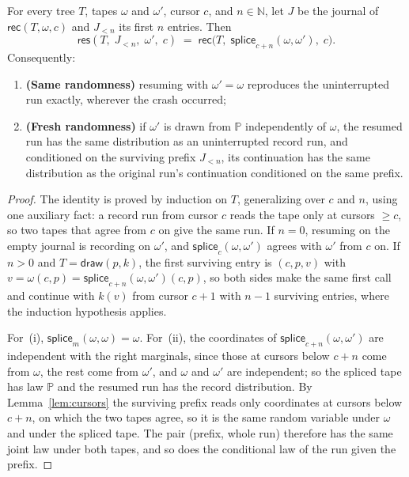\begin{corollary}
\label{cor:resume}
For every tree $T$, tapes $\omega$ and $\omega'$, cursor $c$, and $n \in \mathbb{N}$, let $J$
be the journal of $\mathsf{rec}(T, \omega, c)$ and $J_{<n}$ its first $n$ entries.
Then
\[
  \mathsf{res}(T,\; J_{<n},\; \omega',\; c) \;=\; \mathsf{rec}\bigl(T,\; \mathsf{splice}_{c+n}(\omega, \omega'),\; c\bigr).
\]
Consequently:
\begin{enumerate}[label=(\roman*), noitemsep]
  \item \textbf{(Same randomness)} resuming with $\omega' = \omega$ reproduces the uninterrupted
    run exactly, wherever the crash occurred;
  \item \textbf{(Fresh randomness)} if $\omega'$ is drawn from $\mathbb{P}$ independently of
    $\omega$, the resumed run has the same distribution as an uninterrupted record run, and
    conditioned on the surviving prefix $J_{<n}$, its continuation has the same distribution
    as the original run's continuation conditioned on the same prefix.
\end{enumerate}
\end{corollary}

\begin{proof}
The identity is proved by induction on $T$, generalizing over $c$ and $n$, using one auxiliary
fact: a record run from cursor $c$ reads the tape only at cursors $\geq c$, so two tapes that
agree from $c$ on give the same run.
If $n = 0$, resuming on the empty journal is recording on $\omega'$, and
$\mathsf{splice}_c(\omega, \omega')$ agrees with $\omega'$ from $c$ on.
If $n > 0$ and $T = \mathsf{draw}(p, k)$, the first surviving entry is $(c, p, v)$ with
$v = \omega(c, p) = \mathsf{splice}_{c+n}(\omega,\omega')(c, p)$, so both sides make the same
first call and continue with $k(v)$ from cursor $c+1$ with $n-1$ surviving entries, where the
induction hypothesis applies.

For~(i), $\mathsf{splice}_m(\omega, \omega) = \omega$.
For~(ii), the coordinates of $\mathsf{splice}_{c+n}(\omega, \omega')$ are independent with
the right marginals, since those at cursors below $c+n$ come from $\omega$, the rest come from
$\omega'$, and $\omega$ and $\omega'$ are independent; so the spliced tape has law $\mathbb{P}$
and the resumed run has the record distribution.
By Lemma~\ref{lem:cursors} the surviving prefix reads only coordinates at cursors below $c+n$,
on which the two tapes agree, so it is the same random variable under $\omega$ and under the
spliced tape.
The pair (prefix, whole run) therefore has the same joint law under both tapes, and so does the
conditional law of the run given the prefix.
\end{proof}

